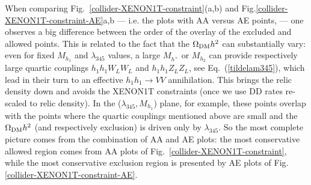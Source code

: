 When comparing Fig.~\ref{collider-XENON1T-constraint}(a,b) and Fig.\ref{collider-XENON1T-constraint-AE}a,b 
--- i.e. the plots with AA versus AE points, --- one observes
a big difference between the order of the overlay of the excluded and allowed points.
This is related to the fact that the $\Omega_{\rm DM} h^2$ can substantially vary:
even for  fixed $M_{h_1}$ and  $\lambda_{345}$ values,
a large $M_{h^+}$ or $M_{h_2}$  can provide respectively large quartic couplings $h_1 h_1 W_L W_L$ and  $h_1 h_1 Z_L Z_L$, see Eq.~(\ref{tildelam345}), 
which lead in their turn to an effective $h_1 h_1 \to VV$  annihilation. This brings the relic density down and 
avoids the XENON1T constraints (once we use DD rates re-scaled to relic density).
In the ($\lambda_{345},M_{h_1}$) plane, for example, these points overlap with the points 
where the quartic couplings mentioned above are small and the  $\Omega_{\rm DM} h^2$ (and respectively exclusion) is driven only by $\lambda_{345}$. 
So the most complete picture comes from the combination of AA and AE plots:
the most conservative allowed region comes from AA plots of Fig.~\ref{collider-XENON1T-constraint}, while the most conservative exclusion region
is presented by AE plots of Fig.\ref{collider-XENON1T-constraint-AE}.

